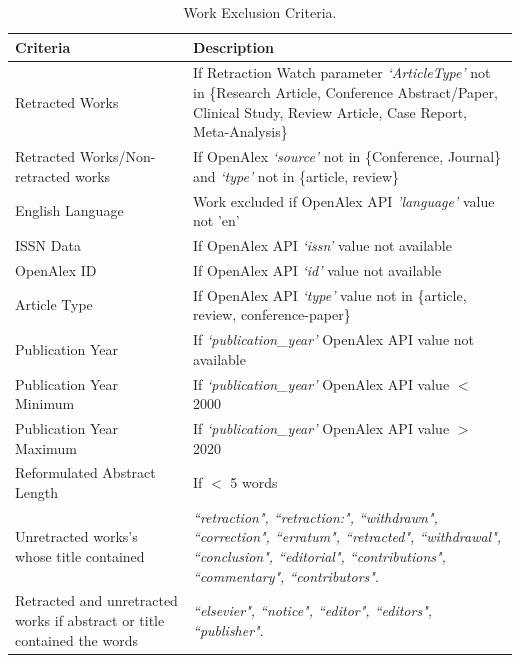 \documentclass[pdflatex,sn-mathphys-num]{sn-jnl}%
\begin{document}
\begin{table}
\caption{Work Exclusion Criteria.\label{tab_work_exclusion_criteria}}
\small
\begin{tabularx}{\textwidth}{>{\hspace{0pt}}p{}>{\raggedright\arraybackslash\hspace{0pt}}X}
\toprule
\textbf{Criteria}	& \textbf{Description}\\
\midrule
Retracted Works & If Retraction Watch parameter \textit{`ArticleType'} not in \{Research Article, Conference Abstract/Paper, Clinical Study, Review Article, Case Report, Meta-Analysis\} \\
Retracted Works/Non-retracted works & If OpenAlex \textit{`source'} not in \{Conference, Journal\} and \textit{`type'} not in \{article, review\}  \\
English Language &  Work excluded if OpenAlex API \textit{'language'} value not 'en' \\
ISSN Data	&  If OpenAlex API \textit{`issn'} value not available \\
OpenAlex ID	&  If OpenAlex API \textit{`id'} value not available \\
Article Type & If OpenAlex API \textit{`type'} value not in \{article, review, conference-paper\} \\
Publication Year & If \textit{`publication\_year'} OpenAlex API value not available \\
Publication Year Minimum & If \textit{`publication\_year'} OpenAlex API value \(<\) 2000 \\
Publication Year Maximum & If \textit{`publication\_year'} OpenAlex API value \(>\) 2020 \\
Reformulated Abstract Length & If \(<\) 5 words \\ 
Unretracted works's whose title contained & \textit{``retraction", ``retraction:", ``withdrawn", ``correction", ``erratum", ``retracted", ``withdrawal", ``conclusion", ``editorial", ``contributions", ``commentary", ``contributors"}.\\
Retracted and unretracted works if abstract or title contained the words &  \textit{``elsevier", ``notice", ``editor", ``editors", ``publisher"}.\\
\bottomrule
\end{tabularx}
\label{tab:Works_Criteria}
\end{table}



\end{document}

